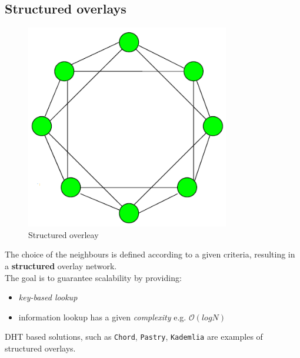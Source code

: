 \subsection{Structured overlays}
\begin{paracol}{2}
   \begin{figure}[htbp]
      \centering
      \includegraphics{images/structured_overleay.png}
      \caption{Structured overleay}
      \label{fig:structured_overleay}
   \end{figure}
   \switchcolumn
   The choice of the neighbours is defined according to a given criteria, resulting in a \textbf{structured} overlay network.\\
   The goal is to guarantee scalability by providing:
   \begin{itemize}
      \item \textit{key-based lookup}
      \item  information lookup has a given \textit{complexity} e.g. $\mathcal{O}(log N)$
   \end{itemize}
   
   DHT based solutions, such as \texttt{Chord}, \texttt{Pastry}, \texttt{Kademlia} are examples of structured overlays.
\end{paracol}
   

